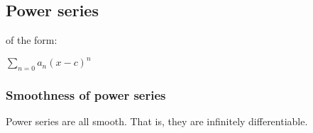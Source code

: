 
\subsection{Power series}

of the form:

\(\sum_{n=0}a_n(x-c)^n\)

\subsubsection{Smoothness of power series}

Power series are all smooth. That is, they are infinitely differentiable.

